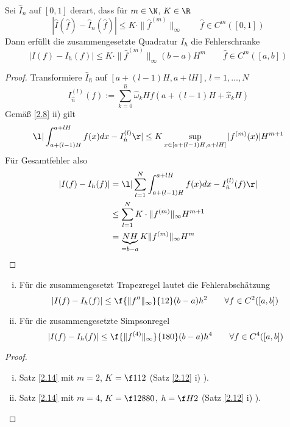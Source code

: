 \documentclass[11pt]{scrbook}
\begin{document}
\begin{st}
	\label{2.14}
	Sei $\hat I_n$ auf $[0,1]$ derart, dass für $m\in \N$, $K\in \R$
	\[
		|\hat I(\hat f) - \hat I_{\hat n}(\hat f)| \le K \cdot \|\hat f^{(m)}\|_\infty
		\qquad \hat f \in C^m([0,1])		
	\]
	Dann erfüllt die zusammengesetzte Quadratur $I_h$ die Fehlerschranke
	\[
		|I(f) - I_{h}(f)| \le K \cdot \|\hat f^{(m)}\|_\infty (b-a) H^m
		\qquad \hat f \in C^m([a,b])	
	\]
	\begin{proof}
		Transformiere $\hat I_{\hat n}$ auf $[a+(l-1)H, a+lH]$, $l=1,\dotsc,N$
		\[
			I_{\hat n}^{(l)}(f) := \sum_{k=0}^{\hat n} \hat \omega_k H f(a+(l-1)H + \hat x_k H)
		\]
		Gemäß \ref{2.8} ii) gilt
		\[
			\l| \int_{a+(l-1)H}^{a+lH} f(x) dx - I_{\hat n}^{(l)}\r| \le K \sup_{x\in [a+(l-1)H,a+lH]} |f^{(m)}(x)| H^{m+1}
		\]
		Für Gesamtfehler also
		\begin{align*}
			|I(f) - I_h(f)| 
			&= \l| \sum_{l=1}^N \int_{a+(l-1)H}^{a+lH} f(x) dx - I_{\hat n}^{(l)}(f)\r| \\
			&\le \sum_{l=1}^N K \cdot \|f^{(m)}\|_\infty H^{m+1} \\
			&= \underbrace{N H}_{=b-a} K \|f^{(m)}\|_\infty H^m
		\end{align*}
	\end{proof}
\end{st}

\begin{kor}
	\label{2.15}
	\begin{enumerate}[i)]
		\item
			Für die zusammengesetzt Trapezregel lautet die Fehlerabschätzung
			\[
				|I(f) - I_h(f)| \le \f {\|f''\|_{\infty}}{12} (b-a) h^2 \qquad \forall f \in C^2 ([a,b])
			\]
		\item
			Für die zusammengesetzte Simpsonregel
			\[
				|I(f) - I_h(f)| \le \f {\|f^{(4)}\|_\infty}{180} (b-a) h^4 \qquad \forall f \in  C^4([a,b])
			\]
	\end{enumerate}
	\begin{proof}
		\begin{enumerate}[i)]
			\item
				Satz \ref{2.14} mit $m=2$, $K=\f 1{12}$ (Satz \ref{2.12} i) ).
			\item
				Satz \ref{2.14} mit $m=4$, $K=\f 1{2880}$, $h=\f H2$ (Satz \ref{2.12} i) ).
		\end{enumerate}
	\end{proof}
\end{kor}
\end{document}
